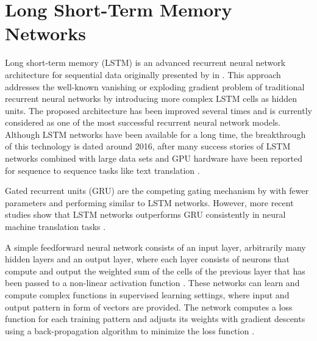 \section{Long Short-Term Memory Networks}

Long short-term memory (LSTM) is an advanced recurrent neural network architecture for sequential data originally presented by \citeauthor{DBLP:journals/neco/HochreiterS97} in \citeyear{DBLP:journals/neco/HochreiterS97} \cite{DBLP:journals/neco/HochreiterS97}.
This approach addresses the well-known vanishing or exploding gradient problem \cite{DBLP:conf/icml/PascanuMB13}  of traditional recurrent neural networks by introducing more complex LSTM cells as hidden units.
The proposed architecture has been improved several times \cite{DBLP:journals/neco/GersSC00} \cite {DBLP:journals/tnn/GreffSKSS17} and is currently considered as one of the most successful recurrent neural network models.
Although LSTM networks have been available for a long time, the breakthrough of this technology is dated around 2016, after many success stories of LSTM networks combined with large data sets and GPU hardware have been reported for sequence to sequence tasks like text translation \cite{DBLP:journals/corr/WuSCLNMKCGMKSJL16}.

Gated recurrent units (GRU) \cite{DBLP:conf/emnlp/ChoMGBBSB14} are the competing gating mechanism by \citeauthor{DBLP:conf/emnlp/ChoMGBBSB14} with fewer parameters and performing similar to LSTM networks.
However, more recent studies show that LSTM networks outperforms GRU consistently in neural machine translation tasks \cite{DBLP:journals/corr/BritzGLL17}.

A simple feedforward neural network consists of an input layer, arbitrarily many hidden layers and an output layer, where each layer consists of neurons that compute and output the weighted sum of the cells of the previous layer that has been passed to a non-linear activation function \cite{DBLP:journals/nn/Schmidhuber15}.
These networks can learn and compute complex functions in supervised learning settings, where input and output pattern in form of vectors are provided.
The network computes a loss function for each training pattern and adjusts its weights with gradient descents using a back-propagation algorithm to minimize the loss function \cite{rumelhart1986learning}.

